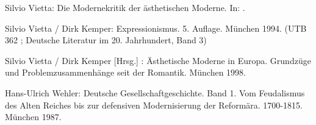 \begin{BibList}{}
  Silvio Vietta:
  Die Modernekritik der ästhetischen Moderne.
  In: .

  Silvio Vietta /
  Dirk Kemper:
  Expressionismus. 5. Auflage.
  München 1994.
  (UTB 362 ; Deutsche Literatur im 20. Jahrhundert, Band 3)

  Silvio Vietta / 
  Dirk Kemper [Hrsg.] :
  Ästhetische Moderne in Europa. Grundzüge und Problemzusammenhänge seit der
  Romantik. 
  München 1998.

  Hans-Ulrich Wehler:
  Deutsche Gesellschaftgeschichte. Band 1. Vom Feudalismus des Alten
  Reiches bis zur defensiven Modernisierung der Reformära. 1700-1815.
  München 1987.

\end{BibList}

